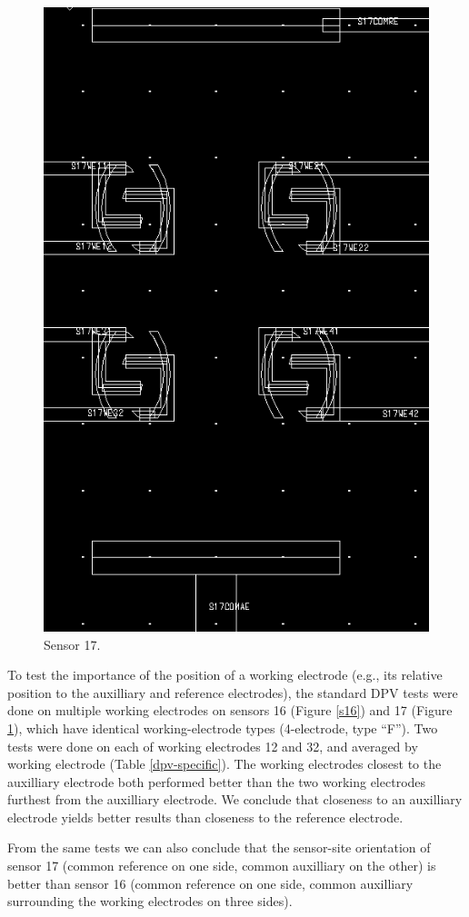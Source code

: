 \begin{figure}
	\centering
	\includegraphics[width=0.7\linewidth]{figures/s17.png}
	\caption{Sensor 17.}
	\label{s17}
\end{figure}

To test the importance of the position of a working electrode (e.g., its relative position to the auxilliary and reference electrodes), the standard DPV tests were done on multiple working electrodes on sensors 16 (Figure \ref{s16}) and 17 (Figure \ref{s17}), which have identical working-electrode types (4-electrode, type ``F''). Two tests were done on each of working electrodes 12 and 32, and averaged by working electrode (Table \ref{dpv-specific}). The working electrodes closest to the auxilliary electrode both performed better than the two working electrodes furthest from the auxilliary electrode. We conclude that closeness to an auxilliary electrode yields better results than closeness to the reference electrode.

From the same tests we can also conclude that the sensor-site orientation of sensor 17 (common reference on one side, common auxilliary on the other) is better than sensor 16 (common reference on one side, common auxilliary surrounding the working electrodes on three sides).

